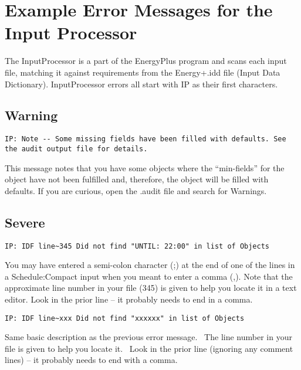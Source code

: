 \section{Example Error Messages for the Input Processor}\label{example-error-messages-for-the-input-processor}

The InputProcessor is a part of the EnergyPlus program and scans each input file, matching it against requirements from the Energy+.idd file (Input Data Dictionary). InputProcessor errors all start with IP as their first characters.

\subsection{Warning}\label{warning-001}

\begin{lstlisting}
IP: Note -- Some missing fields have been filled with defaults. See the audit output file for details.
\end{lstlisting}

This message notes that you have some objects where the ``min-fields'' for the object have not been fulfilled and, therefore, the object will be filled with defaults. If you are curious, open the .audit file and search for Warnings.

\subsection{Severe}\label{severe-001}

\begin{lstlisting}
IP: IDF line~345 Did not find "UNTIL: 22:00" in list of Objects
\end{lstlisting}

You may have entered a semi-colon character (;) at the end of one of the lines in a Schedule:Compact input when you meant to enter a comma (,). Note that the approximate line number in your file (345) is given to help you locate it in a text editor. Look in the prior line -- it probably needs to end in a comma.

\begin{lstlisting}
IP: IDF line~xxx Did not find "xxxxxx" in list of Objects
\end{lstlisting}

Same basic description as the previous error message.~ The line number in your file is given to help you locate it.~ Look in the prior line (ignoring any comment lines) -- it probably needs to end with a comma.

